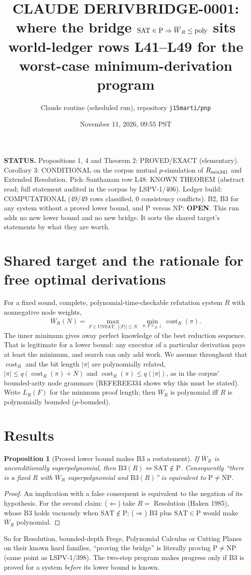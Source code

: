 \documentclass[11pt]{article}
\title{CLAUDE DERIVBRIDGE-0001: where the bridge $\mathrm{SAT}\in\mathrm P\Rightarrow\Wb_R\le\mathrm{poly}$ sits\\
\large world-ledger rows L41--L49 for the worst-case minimum-derivation program}
\author{Claude routine (scheduled run), repository \texttt{j15marti/pnp}}
\date{November 11, 2026, 09:55 PST}
\newtheorem{proposition}[theorem]{Proposition}
\newcommand{\Wb}{\overline W}
\begin{document}
\maketitle

\noindent\textbf{STATUS.} Propositions 1, 4 and Theorem 2: PROVED/EXACT (elementary).
Corollary 3: CONDITIONAL on the corpus mutual $p$-simulation of $R_{\rm mix341}$ and
Extended Resolution. Pich--Santhanam row L48: KNOWN THEOREM (abstract read; full
statement audited in the corpus by LSPV-1/406). Ledger build: COMPUTATIONAL
(49/49 rows classified, 0 consistency conflicts). B2, B3 for any system without a
proved lower bound, and P versus NP: \textbf{OPEN}.
This run adds no new lower bound and no new bridge. It sorts the shared target's
statements by what they are worth.

\section{Shared target and the rationale for free optimal derivations}
For a fixed sound, complete, polynomial-time-checkable refutation system $R$ with nonnegative
node weights,
\[
\Wb_R(N)=\max_{F\in\mathrm{UNSAT},\ |\langle F\rangle|\le N}\ \min_{\pi:F\vdash_R\bot}\operatorname{cost}_R(\pi).
\]
The inner minimum gives away perfect knowledge of the best reduction sequence. That is
legitimate for a lower bound: any executor of a particular derivation pays at least the
minimum, and search can only add work. We assume throughout that
$\operatorname{cost}_R$ and the bit length $|\pi|$ are polynomially related,
$|\pi|\le q(\operatorname{cost}_R(\pi)+N)$ and $\operatorname{cost}_R(\pi)\le q(|\pi|)$,
as in the corpus' bounded-arity node grammars (REFEREE334 shows why this must be stated).
Write $L_R(F)$ for the minimum proof length; then $\Wb_R$ is polynomial iff $R$ is
polynomially bounded ($p$-bounded).

\section{Results}
\begin{proposition}[Proved lower bound makes B3 a restatement]\label{p1}
If $\Wb_R$ is unconditionally superpolynomial, then
$\mathrm{B3}(R)\iff\mathrm{SAT}\notin\mathrm P$. Consequently ``there is a fixed $R$ with
$\Wb_R$ superpolynomial and $\mathrm{B3}(R)$'' is equivalent to $\mathrm P\ne\mathrm{NP}$.
\end{proposition}
\begin{proof}
An implication with a false consequent is equivalent to the negation of its hypothesis.
For the second claim: ($\Leftarrow$) take $R=$ Resolution (Haken 1985), whose B3 holds
vacuously when $\mathrm{SAT}\notin\mathrm P$; ($\Rightarrow$) B3 plus $\mathrm{SAT}\in\mathrm P$
would make $\Wb_R$ polynomial.
\end{proof}
So for Resolution, bounded-depth Frege, Polynomial Calculus or Cutting Planes on their
known hard families, ``proving the bridge'' is literally proving $\mathrm P\ne\mathrm{NP}$
(same point as LSPV-1/398). The two-step program makes progress only if B3 is proved
for a system \emph{before} its lower bound is known.
\end{document}
